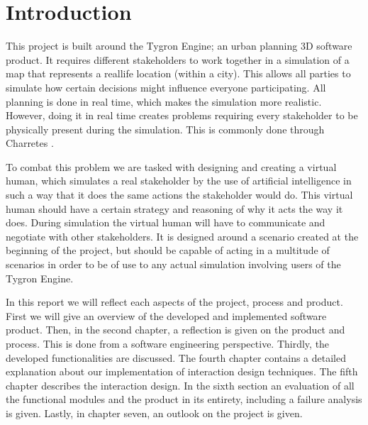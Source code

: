 \section{Introduction}

This project is built around the Tygron Engine; an urban planning 3D software product. It requires different stakeholders to work together in a simulation of a map that represents a reallife location (within a city). This allows all parties to simulate how certain decisions might influence everyone participating. All planning is done in real time, which makes the simulation more realistic. However, doing it in real time creates problems requiring every stakeholder to be physically present during the simulation. This is commonly done through Charretes \cite{Todd13}. 

To combat this problem we are tasked with designing and creating a virtual human, which simulates a real stakeholder by the use of artificial intelligence in such a way that it does the same actions the stakeholder would do. This virtual human should have a certain strategy and reasoning of why it acts the way it does. During simulation the virtual human will have to communicate and negotiate with other stakeholders. It is designed around a scenario created at the beginning of the project, but should be capable of acting in a multitude of scenarios in order to be of use to any actual simulation involving users of the Tygron Engine.

In this report we will reflect each aspects of the project, process and product. First we will give an overview of the developed and implemented software product. Then, in the second chapter, a reflection is given on the product and process. This is done from a software engineering perspective. Thirdly, the developed functionalities are discussed. The fourth chapter contains a detailed explanation about our implementation of interaction design techniques. The fifth chapter describes the interaction design. In the sixth section an evaluation of all the functional modules and the product in its entirety, including a failure analysis is given. Lastly, in chapter seven, an outlook on the project is given.

